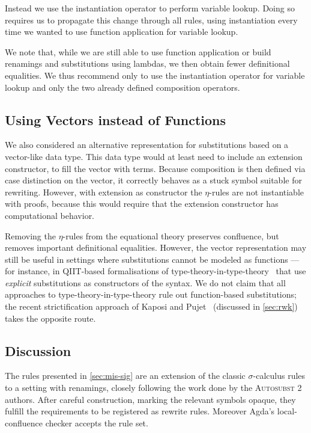 \documentclass[a4paper,UKenglish,cleveref, autoref, thm-restate,anonymous]{lipics-v2021}
\begin{document}
Instead we use the instantiation operator to perform variable lookup. Doing so
requires us to propagate this change through all rules, using instantiation
every time we wanted to use function application for variable lookup.

We note that, while we are still able to use function application or build
renamings and substitutions using lambdas, we then obtain fewer definitional
equalities. We thus recommend only to use the instantiation operator for
variable lookup and only the two already defined composition operators.

\subsection*{Using Vectors instead of Functions}

We also considered an alternative representation for substitutions based on a
vector-like data type. This data type would at least need to include an
extension constructor, to fill the vector with terms. Because composition is
then defined via case distinction on the vector, it correctly behaves as a
stuck symbol suitable for rewriting. However, with extension as constructor the
$η$-rules are not instantiable with proofs, because this would require that the
extension constructor has computational behavior.

Removing the $η$-rules from the equational theory preserves confluence, but
removes important definitional equalities. However, the vector representation
may still be useful in settings where substitutions cannot be modeled as
functions --- for instance, in QIIT-based formalisations of
type-theory-in-type-theory~\cite{10.1145/2914770.2837638} that use
\emph{explicit} substitutions as constructors of the syntax. We do not claim
that all approaches to type-theory-in-type-theory rule out function-based
substitutions; the recent strictification approach of Kaposi and
Pujet~\cite{10.1145/3747535} (discussed in \cref{sec:rwk}) takes the opposite
route.

\subsection{Discussion}\label{sec:mis-dis}
The rules presented in \cref{sec:mis-sig} are an extension of the classic
$σ$-calculus rules to a setting with renamings, closely following the work
done by the \textsc{Autosubst 2} authors. After careful construction, marking
the relevant symbols opaque, they fulfill the requirements to be registered as
rewrite rules. Moreover Agda's local-confluence checker accepts the rule set.
\end{document}
